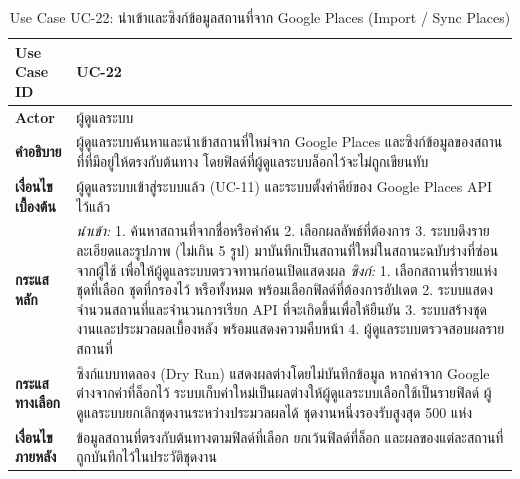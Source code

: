 \begin{table}[H]
\centering
\caption{Use Case UC-22: นำเข้าและซิงก์ข้อมูลสถานที่จาก Google Places (Import / Sync Places)}
\label{tab:uc22}
\begin{tabular}{|p{3.2cm}|p{10cm}|}
\hline
\textbf{Use Case ID} & UC-22 \\ \hline
\textbf{Actor} & ผู้ดูแลระบบ \\ \hline
\textbf{คำอธิบาย} & ผู้ดูแลระบบค้นหาและนำเข้าสถานที่ใหม่จาก Google Places และซิงก์ข้อมูลของสถานที่ที่มีอยู่ให้ตรงกับต้นทาง โดยฟิลด์ที่ผู้ดูแลระบบล็อกไว้จะไม่ถูกเขียนทับ \\ \hline
\textbf{เงื่อนไขเบื้องต้น} & ผู้ดูแลระบบเข้าสู่ระบบแล้ว (UC-11) และระบบตั้งค่าคีย์ของ Google Places API ไว้แล้ว \\ \hline
\textbf{กระแสหลัก} & \textit{นำเข้า:} 1. ค้นหาสถานที่จากชื่อหรือคำค้น 2. เลือกผลลัพธ์ที่ต้องการ 3. ระบบดึงรายละเอียดและรูปภาพ (ไม่เกิน 5 รูป) มาบันทึกเป็นสถานที่ใหม่ในสถานะฉบับร่างที่ซ่อนจากผู้ใช้ เพื่อให้ผู้ดูแลระบบตรวจทานก่อนเปิดแสดงผล \newline \textit{ซิงก์:} 1. เลือกสถานที่รายแห่ง ชุดที่เลือก ชุดที่กรองไว้ หรือทั้งหมด พร้อมเลือกฟิลด์ที่ต้องการอัปเดต 2. ระบบแสดงจำนวนสถานที่และจำนวนการเรียก API ที่จะเกิดขึ้นเพื่อให้ยืนยัน 3. ระบบสร้างชุดงานและประมวลผลเบื้องหลัง พร้อมแสดงความคืบหน้า 4. ผู้ดูแลระบบตรวจสอบผลรายสถานที่ \\ \hline
\textbf{กระแสทางเลือก} & ซิงก์แบบทดลอง (Dry Run) แสดงผลต่างโดยไม่บันทึกข้อมูล \newline หากค่าจาก Google ต่างจากค่าที่ล็อกไว้ ระบบเก็บค่าใหม่เป็นผลต่างให้ผู้ดูแลระบบเลือกใช้เป็นรายฟิลด์ \newline ผู้ดูแลระบบยกเลิกชุดงานระหว่างประมวลผลได้ \newline ชุดงานหนึ่งรองรับสูงสุด 500 แห่ง \\ \hline
\textbf{เงื่อนไขภายหลัง} & ข้อมูลสถานที่ตรงกับต้นทางตามฟิลด์ที่เลือก ยกเว้นฟิลด์ที่ล็อก และผลของแต่ละสถานที่ถูกบันทึกไว้ในประวัติชุดงาน \\
\hline
\end{tabular}
\end{table}

